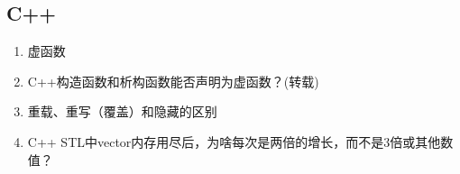\documentclass[letterpaper,10pt,english]{sphinxmanual}
\begin{document}
\subsection{C++}
\label{\detokenize{else/01_interview:c}}\begin{enumerate}
\item {} 
虚函数

\end{enumerate}
\begin{quote}

\end{quote}
\begin{enumerate}
\setcounter{enumi}{1}
\item {} 
C++构造函数和析构函数能否声明为虚函数？(转载)

\end{enumerate}
\begin{quote}

\end{quote}
\begin{enumerate}
\setcounter{enumi}{2}
\item {} 
重载、重写（覆盖）和隐藏的区别

\end{enumerate}
\begin{quote}

\end{quote}
\begin{enumerate}
\setcounter{enumi}{3}
\item {} 
C++ STL中vector内存用尽后，为啥每次是两倍的增长，而不是3倍或其他数值？

\end{enumerate}
\begin{quote}

\end{quote}
\end{document}

